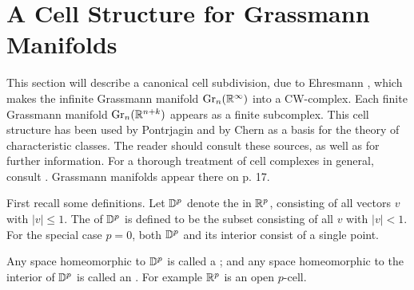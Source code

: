 \documentclass[../main]{subfiles}
\begin{document}
\setcounter{chapter}{5}
\chapter{A Cell Structure for Grassmann Manifolds}\label{ch:6}

This section will describe a canonical cell subdivision, due to Ehresmann \cite{ehresmann1934}, which makes the infinite Grassmann manifold $\operatorname{Gr}_{n}(\mathbb R^\infty)$ into a CW-complex. Each finite Grassmann manifold $\operatorname{Gr}_{n}(\mathbb R^{n+k})$ appears as a finite subcomplex. This cell structure has been used by Pontrjagin \cite{pontryagin1947} and by Chern \cite{chern1948} as a basis for the theory of characteristic classes. The reader should consult these sources, as well as \cite{wu1948} for further information. For a thorough treatment of cell complexes in general, consult \cite{lundellweingram1969}. Grassmann manifolds appear there on p. 17.

First recall some definitions. Let $\mathbb{D}^{p}$ denote the  in $\mathbb R^p$, consisting of all vectors $v$ with $| v | \leq 1$. The  of $\mathbb{D}^{p}$ is defined to be the subset consisting of all $v$ with $|v|<1$. For the special case $p=0$, both $\mathbb{D}^{p}$ and its interior consist of a single point.

Any space homeomorphic to $\mathbb{D}^{p}$ is called a ; and any space homeomorphic to the interior of $\mathbb{D}^{p}$ is called an . For example $\mathbb R^p$ is an open $p$-cell.
\end{document}
